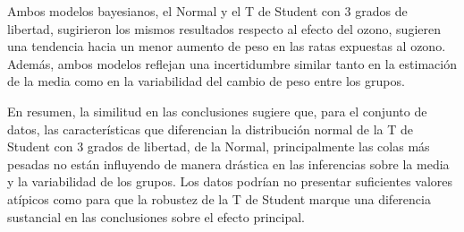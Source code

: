 \documentclass[
]{article}
\begin{document}
Ambos modelos bayesianos, el Normal y el T de Student con 3 grados de libertad, sugirieron los mismos resultados respecto al efecto del ozono, sugieren una tendencia hacia un menor aumento de peso en las ratas expuestas al ozono. Además, ambos modelos reflejan una incertidumbre similar tanto en la estimación de la media como en la variabilidad del cambio de peso entre los grupos.

En resumen, la similitud en las conclusiones sugiere que, para el conjunto de datos, las características que diferencian la distribución normal de la T de Student con 3 grados de libertad, de la Normal, principalmente las colas más pesadas no están influyendo de manera drástica en las inferencias sobre la media y la variabilidad de los grupos. Los datos podrían no presentar suficientes valores atípicos como para que la robustez de la T de Student marque una diferencia sustancial en las conclusiones sobre el efecto principal.
\end{document}
